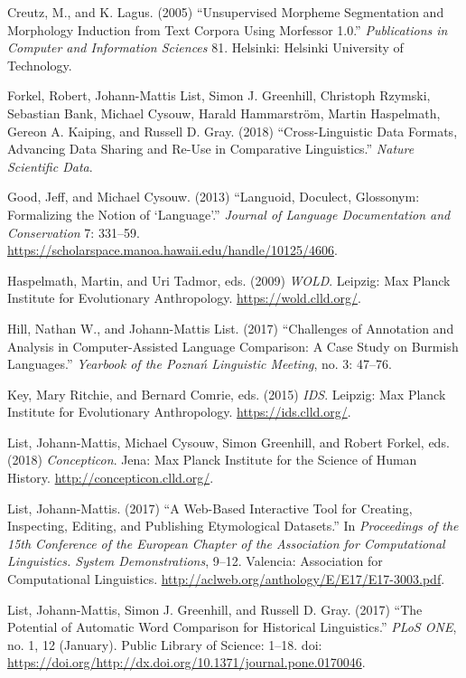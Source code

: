 \documentclass[
  english,
  a4paper,
  oneside,tablecaptionabove
]{scrbook}
\begin{document}
Creutz, M., and K. Lagus. (2005) \enquote{Unsupervised Morpheme
Segmentation and Morphology Induction from Text Corpora Using Morfessor
1.0.} \emph{Publications in Computer and Information Sciences} 81. Helsinki:
Helsinki University of Technology.

Forkel, Robert, Johann-Mattis List, Simon J. Greenhill, Christoph
Rzymski, Sebastian Bank, Michael Cysouw, Harald Hammarström, Martin
Haspelmath, Gereon A. Kaiping, and Russell D. Gray. (2018)
\enquote{Cross-Linguistic Data Formats, Advancing Data Sharing and
Re-Use in Comparative Linguistics.} \emph{Nature Scientific Data}.

Good, Jeff, and Michael Cysouw. (2013) \enquote{Languoid, Doculect,
Glossonym: Formalizing the Notion of \enquote{Language}.} \emph{Journal
of Language Documentation and Conservation} 7: 331--59.
\url{https://scholarspace.manoa.hawaii.edu/handle/10125/4606}.

Haspelmath, Martin, and Uri Tadmor, eds. (2009) \emph{WOLD}.
Leipzig: Max Planck Institute for Evolutionary Anthropology.
\url{https://wold.clld.org/}.

Hill, Nathan W., and Johann-Mattis List. (2017) \enquote{Challenges
of Annotation and Analysis in Computer-Assisted Language Comparison: A
Case Study on Burmish Languages.} \emph{Yearbook of the Poznań
Linguistic Meeting}, no. 3: 47--76.

Key, Mary Ritchie, and Bernard Comrie, eds. (2015) \emph{IDS}.
Leipzig: Max Planck Institute for Evolutionary Anthropology.
\url{https://ids.clld.org/}.

List, Johann-Mattis, Michael Cysouw, Simon Greenhill, and Robert
Forkel, eds. (2018) \emph{Concepticon}. Jena: Max Planck Institute for
the Science of Human History. \url{http://concepticon.clld.org/}.

List, Johann-Mattis. (2017) \enquote{A Web-Based Interactive Tool for
Creating, Inspecting, Editing, and Publishing Etymological Datasets.} In
\emph{Proceedings of the 15th Conference of the European Chapter of the
Association for Computational Linguistics. System Demonstrations},
9--12. Valencia: Association for Computational Linguistics.
\url{http://aclweb.org/anthology/E/E17/E17-3003.pdf}.

List, Johann-Mattis, Simon J. Greenhill, and Russell D. Gray. (2017)
\enquote{The Potential of Automatic Word Comparison for Historical
Linguistics.} \emph{PLoS ONE}, no. 1, 12 (January). Public Library of
Science: 1--18. doi:
\url{https://doi.org/http://dx.doi.org/10.1371/journal.pone.0170046}.
\end{document}
